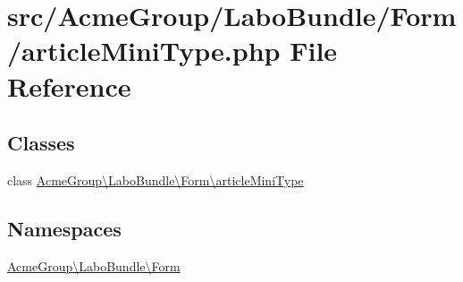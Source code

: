 \hypertarget{article_mini_type_8php}{\section{src/\+Acme\+Group/\+Labo\+Bundle/\+Form/article\+Mini\+Type.php File Reference}
\label{article_mini_type_8php}
}
\subsection*{Classes}
\begin{DoxyCompactItemize}
\item 
class \hyperlink{class_acme_group_1_1_labo_bundle_1_1_form_1_1article_mini_type}{Acme\+Group\textbackslash{}\+Labo\+Bundle\textbackslash{}\+Form\textbackslash{}article\+Mini\+Type}
\end{DoxyCompactItemize}
\subsection*{Namespaces}
\begin{DoxyCompactItemize}
\item 
 \hyperlink{namespace_acme_group_1_1_labo_bundle_1_1_form}{Acme\+Group\textbackslash{}\+Labo\+Bundle\textbackslash{}\+Form}
\end{DoxyCompactItemize}
